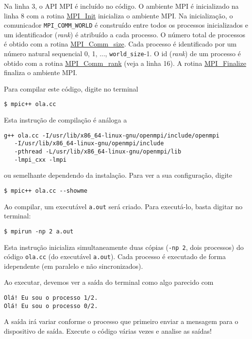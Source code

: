 Na linha 3, o API MPI é incluído no código. O ambiente MPI é inicializado na linha 8 com a rotina \href{https://www.open-mpi.org/doc/v4.1/man3/MPI\_Init.3.php}{MPI\_Init} inicializa o ambiente MPI. Na inicialização, o comunicador \verb+MPI_COMM_WORLD+ é construído entre todos os processos inicializados e um identificador ({\it rank}) é atribuído a cada processo. O número total de processos é obtido com a rotina \href{https://www.open-mpi.org/doc/v4.1/man3/MPI\_Comm\_size.3.php}{MPI\_Comm\_size}. Cada processo é identificado por um número natural sequencial 0, 1, ..., \verb+world_size+-1. O id ({\it rank}) de um processo é obtido com a rotina \href{https://www.open-mpi.org/doc/v4.1/man3/MPI\_Comm\_rank.3.php}{MPI\_Comm\_rank} (veja a linha 16). A rotina \href{https://www.open-mpi.org/doc/v4.1/man3/MPI\_Finalize.3.php}{MPI\_Finalize} finaliza o ambiente MPI.


Para compilar este código, digite no terminal
\begin{verbatim}
$ mpic++ ola.cc
\end{verbatim}
Esta instrução de compilação é análoga a
\begin{verbatim}
g++ ola.cc -I/usr/lib/x86_64-linux-gnu/openmpi/include/openmpi
   -I/usr/lib/x86_64-linux-gnu/openmpi/include 
   -pthread -L/usr/lib/x86_64-linux-gnu/openmpi/lib 
   -lmpi_cxx -lmpi
\end{verbatim}
ou semelhante dependendo da instalação. Para ver a sua configuração, digite
\begin{verbatim}
$ mpic++ ola.cc --showme
\end{verbatim}


Ao compilar, um executável \verb+a.out+ será criado. Para executá-lo, basta digitar no terminal:
\begin{verbatim}
$ mpirun -np 2 a.out
\end{verbatim}
Esta instrução inicializa simultaneamente duas cópias (\verb+-np 2+, dois processos) do código \verb+ola.cc+ (do executável \verb+a.out+). Cada processo é executado de forma idependente (em paralelo e não sincronizados).

Ao executar, devemos ver a saída do terminal como algo parecido com
\begin{verbatim}
Olá! Eu sou o processo 1/2.
Olá! Eu sou o processo 0/2.
\end{verbatim}

A saída irá variar conforme o processo que primeiro enviar a mensagem para o dispositivo de saída. Execute o código várias vezes e analise as saídas!

